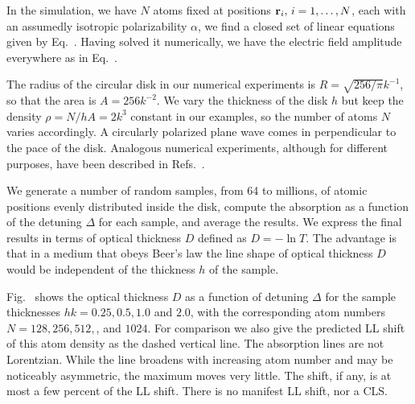 In the simulation, we have $N$ atoms fixed at positions ${\bf r}_i,\, i=1,\dots,N$, each with an assumedly isotropic polarizability $\alpha$, we find a closed set of linear equations given by Eq.~. Having solved it numerically, we have the electric field amplitude everywhere as in Eq.~.

The radius of the circular disk in our numerical experiments is $R=\sqrt{256/\pi}k^{-1}$, so that the area is $A=256k^{-2}$. We vary the thickness of the disk $h$ but keep the density $\rho=N/hA=2k^3$ constant in our examples, so the number of atoms $N$ varies accordingly. A circularly polarized plane wave comes in perpendicular to the pace of the disk. Analogous numerical experiments, although for different purposes, have been described in Refs.~\cite{1367-2630-14-5-055001,PhysRevA.86.031602}.  

We generate a number of random samples, from 64 to millions, of atomic positions evenly distributed inside the disk, compute the absorption as a function of the detuning $\Delta$ for each sample, and average the results. We express the final results in terms of optical thickness $D$ defined as $D=-\ln T$. The advantage is that in a medium that obeys Beer's law the line shape of optical thickness $D$ would be independent of the thickness $h$ of the sample. 

Fig.~ shows the optical thickness $D$ as a function of detuning $\Delta$ for the sample thicknesses $hk=0.25, 0.5, 1.0$ and $2.0$, with the corresponding atom numbers $N=128, 256, 512,$, and $1024$. For comparison we also give the predicted LL shift of this atom density as the dashed vertical line. The absorption lines are not Lorentzian. While the line broadens with increasing atom number and may be noticeably asymmetric, the maximum moves very little. The shift, if any, is at most a few percent of the LL shift. There is no manifest LL shift, nor a CLS.


